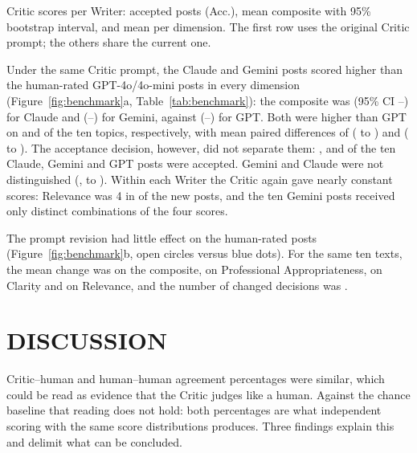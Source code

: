 \documentclass[a4paper,twoside]{article}
\begin{document}
\begin{table}[t]
\centering
\caption{Critic scores per Writer: accepted posts (Acc.), mean composite with 95\% bootstrap interval, and mean per dimension. The first row uses the original Critic prompt; the others share the current one.}
\label{tab:benchmark}
\begin{adjustbox}{max width=\columnwidth}

\end{adjustbox}
\end{table}

Under the same Critic prompt, the Claude and Gemini posts scored higher than the human-rated GPT-4o/4o-mini posts in every dimension (Figure~\ref{fig:benchmark}a, Table~\ref{tab:benchmark}): the composite was \BmClaComp{} (95\% CI \BmClaCompLo{}--\BmClaCompHi{}) for Claude and \BmGemComp{} (\BmGemCompLo{}--\BmGemCompHi{}) for Gemini, against \BmGptComp{} (\BmGptCompLo{}--\BmGptCompHi{}) for GPT. Both were higher than GPT on \BmWinsClaGpt{} and \BmWinsGemGpt{} of the ten topics, respectively, with mean paired differences of \BmDiffClaGpt{} (\BmDiffClaGptLo{} to \BmDiffClaGptHi{}) and \BmDiffGemGpt{} (\BmDiffGemGptLo{} to \BmDiffGemGptHi{}). The acceptance decision, however, did not separate them: \BmClaAccept{}, \BmGemAccept{} and \BmGptAccept{} of the ten Claude, Gemini and GPT posts were accepted. Gemini and Claude were not distinguished (\BmDiffGemCla{}, \BmDiffGemClaLo{} to \BmDiffGemClaHi{}). Within each Writer the Critic again gave nearly constant scores: Relevance was 4 in \BmRelModeShare{} of the new posts, and the ten Gemini posts received only \BmGemVectors{} distinct combinations of the four scores.

The prompt revision had little effect on the human-rated posts (Figure~\ref{fig:benchmark}b, open circles versus blue dots). For the same ten texts, the mean change was \BmShiftComp{} on the composite, \BmShiftPro{} on Professional Appropriateness, \BmShiftClar{} on Clarity and \BmShiftRel{} on Relevance, and the number of changed decisions was \BmShiftDecisions{}.

\section{\uppercase{Discussion}}
\label{sec:discussion}

Critic--human and human--human agreement percentages were similar, which could be read as evidence that the Critic judges like a human. Against the chance baseline that reading does not hold: both percentages are what independent scoring with the same score distributions produces. Three findings explain this and delimit what can be concluded.
\end{document}
